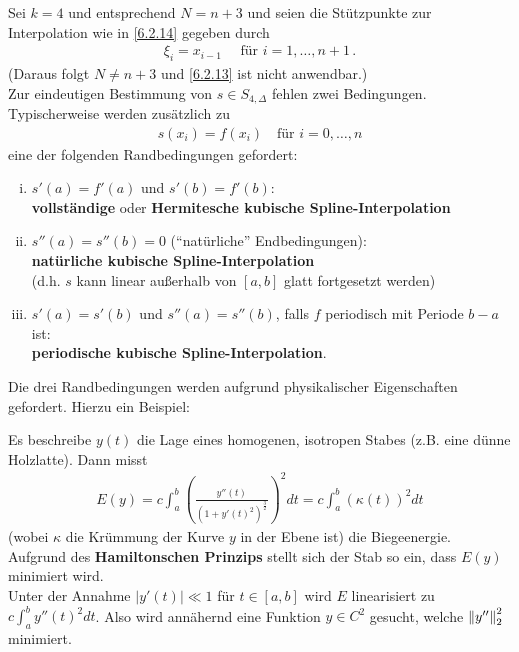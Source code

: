  \label{6.2.15}
Sei $k=4$ und entsprechend $N=n+3$ und 
seien die Stützpunkte zur Interpolation wie in \ref{6.2.14}
gegeben durch 
\begin{gather*}
  \xi_i = x_{i-1} \quad \text{ für } i=1, \ldots, n+1\,.
\end{gather*}
(Daraus folgt $N\neq n+3$ und \ref{6.2.13} ist nicht anwendbar.)\\
Zur eindeutigen Bestimmung von $s\in S_{4,\Delta}$ fehlen zwei
Bedingungen.\\
Typischerweise werden 
zusätzlich zu 
\begin{gather*}
  s(x_i)=f(x_i) \quad \text{für } i=0,\ldots,n
\end{gather*} 
eine der folgenden Randbedingungen gefordert:
\begin{enumerate}[i)]
\item $s'(a)=f'(a)$ und $s'(b)=f'(b)$:  \\
  \textbf{vollständige} oder \textbf{Hermitesche kubische 
    Spline-Interpolation} 
\item $s''(a)=s''(b)=0$ (\enquote{natürliche}  Endbedingungen):\\
  \textbf{natürliche kubische Spline-Interpolation}\\
  (d.h. $s$ kann linear außerhalb von $[a,b]$ glatt fortgesetzt
  werden) 
\item $s'(a)=s'(b)$ und $s''(a)=s''(b)$,
  falls $f$ periodisch mit Periode $b-a$ ist: \\
  \textbf{periodische kubische Spline-Interpolation}.
\end{enumerate}
Die drei Randbedingungen werden aufgrund physikalischer
Eigenschaften gefordert. Hierzu ein Beispiel: 

Es beschreibe $y(t)$ die Lage eines
homogenen, isotropen Stabes (z.B. eine dünne Holzlatte).
Dann misst
\begin{gather*}
  E(y) = c \int_a^b\left(
    \frac{y''(t)}{(1+y'(t)^2)^{\frac{3}{2}}}
  \right)^2dt
  = c \int_a^b\left(
    \kappa(t)
  \right)^2dt
\end{gather*}
(wobei $\kappa $ die Krümmung der Kurve $y$ in der Ebene ist) 
die Biegeenergie.\\
Aufgrund des \textbf{Hamiltonschen Prinzips}
stellt sich der Stab so ein, dass $E(y)$ minimiert wird.\\
Unter der Annahme $|y'(t)| \ll 1$ für $t\in [a,b]$ 
wird $E$ linearisiert zu $c\int_a^by''(t)^2dt$.
Also wird annähernd eine Funktion $y\in C^2$ gesucht,
welche $\nn[y'']_2^2$ minimiert.

